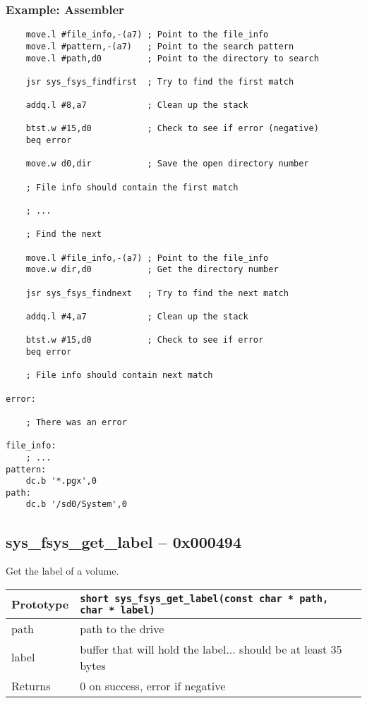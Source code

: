 \subsubsection*{Example: Assembler}
\begin{verbatim}
    move.l #file_info,-(a7) ; Point to the file_info 
    move.l #pattern,-(a7)   ; Point to the search pattern
    move.l #path,d0         ; Point to the directory to search

    jsr sys_fsys_findfirst  ; Try to find the first match

    addq.l #8,a7            ; Clean up the stack

    btst.w #15,d0           ; Check to see if error (negative)
    beq error

    move.w d0,dir           ; Save the open directory number

    ; File info should contain the first match

    ; ...

    ; Find the next

    move.l #file_info,-(a7) ; Point to the file_info
    move.w dir,d0           ; Get the directory number

    jsr sys_fsys_findnext   ; Try to find the next match

    addq.l #4,a7            ; Clean up the stack

    btst.w #15,d0           ; Check to see if error
    beq error

    ; File info should contain next match

error:

    ; There was an error

file_info:
    ; ...
pattern:
    dc.b '*.pgx',0
path:
    dc.b '/sd0/System',0
\end{verbatim}


\subsection*{sys\_fsys\_get\_label -- 0x000494}
Get the label of a volume.

\bigskip

\begin{tabular}{|l||l|} \hline
Prototype & \lstinline!short sys_fsys_get_label(const char * path, char * label)! \\ \hline
path & path to the drive \\ \hline
label & buffer that will hold the label... should be at least 35 bytes \\ \hline
Returns & 0 on success, error if negative \\ \hline
\end{tabular}

